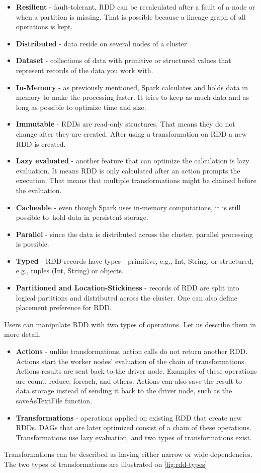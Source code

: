 \begin{itemize}
\item \textbf{Resilient} - fault-tolerant, RDD can be recalculated after a fault of a node or when a partition is missing. That is possible because a lineage graph of all operations is kept.
\item\textbf{Distributed} - data reside on several nodes of a cluster
\item\textbf{Dataset} - collections of data with primitive or structured values that represent records of the data you work with.
\item\textbf{In-Memory} - as previously mentioned, Spark calculates and holds data in memory to make the processing faster. It tries to keep as much data and as long as possible to optimize time and size.
\item\textbf{Immutable} - RDDs are read-only structures.  That means they do not change after they are created. After using a transformation on RDD a new RDD is created.
\item\textbf{Lazy evaluated} - another feature that can optimize the calculation is lazy evaluation. It means RDD is only calculated after an action prompts the execution. That means that multiple transformations might be chained before the evaluation.
\item\textbf{Cacheable} - even though Spark uses in-memory computations, it is still possible to~hold data in persistent storage.
\item\textbf{Parallel} - since the data is distributed across the cluster, parallel processing is possible.
\item\textbf{Typed} - RDD records have types - primitive, e.g., Int, String, or structured, e.g., tuples (Int, String) or objects.
\item\textbf{Partitioned and Location-Stickiness} - records of RDD are split into logical partitions and distributed across the cluster. One can also define placement preference for RDD.
\end{itemize}



Users can manipulate RDD with two types of operations. Let us describe them in more detail.

\begin{itemize}
\item \textbf{Actions} - unlike transformations, action calls do not return another RDD. Actions start the worker nodes' evaluation of the chain of transformations. Actions results are sent back to the driver node. Examples of these operations are count, reduce, foreach, and others.
Actions can also save the result to data storage instead of sending it back to the driver node, such as the saveAsTextFile function.


\item \textbf{Transformations} - operations applied on existing RDD that create new RDDs. DAGs that are later optimized consist of a chain of these operations. Transformations use lazy evaluation, and two types of transformations exist.
\end{itemize}
Transformations can be described as having either narrow or wide dependencies. The two types of transformations are illustrated on \ref{fig:rdd-types}

